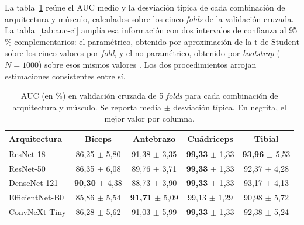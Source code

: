 \documentclass[12pt]{extarticle}
\numberwithin{equation}{section}
\begin{document}
\begin{refsection}
La tabla~\ref{tab:auc-arq-mus} reúne el AUC medio y la desviación típica de cada combinación de arquitectura y músculo, calculados sobre los cinco \textit{folds} de la validación cruzada. La tabla~\ref{tab:auc-ci} amplía esa información con dos intervalos de confianza al 95\,\% complementarios: el paramétrico, obtenido por aproximación de la t de Student sobre los cinco valores por \textit{fold}, y el no paramétrico, obtenido por \textit{bootstrap} ($N=1000$) sobre esos mismos valores \cite{efron1979bootstrap}. Los dos procedimientos arrojan estimaciones consistentes entre sí.

\begin{table}[h!]
\centering
\caption{AUC (en \%) en validación cruzada de 5 \textit{folds} para cada combinación de arquitectura y músculo. Se reporta media $\pm$ desviación típica. En negrita, el mejor valor por columna.}
\label{tab:auc-arq-mus}
\begin{tabular}{lcccc}
\toprule
\textbf{Arquitectura} & \textbf{Bíceps} & \textbf{Antebrazo} & \textbf{Cuádriceps} & \textbf{Tibial} \\
\midrule
ResNet-18       & 86{,}25 $\pm$ 5{,}80 & 91{,}38 $\pm$ 3{,}35 & \textbf{99{,}33} $\pm$ 1{,}33 & \textbf{93{,}96} $\pm$ 5{,}53 \\
ResNet-50       & 86{,}35 $\pm$ 6{,}08 & 89{,}76 $\pm$ 3{,}71 & \textbf{99{,}33} $\pm$ 1{,}33 & 92{,}37 $\pm$ 4{,}28 \\
DenseNet-121    & \textbf{90{,}30} $\pm$ 4{,}38 & 88{,}73 $\pm$ 3{,}90 & \textbf{99{,}33} $\pm$ 1{,}33 & 93{,}17 $\pm$ 4{,}13 \\
EfficientNet-B0 & 85{,}86 $\pm$ 5{,}54 & \textbf{91{,}71} $\pm$ 5{,}09 & 99{,}13 $\pm$ 1{,}29 & 90{,}98 $\pm$ 5{,}72 \\
ConvNeXt-Tiny   & 86{,}28 $\pm$ 5{,}62 & 91{,}03 $\pm$ 5{,}99 & \textbf{99{,}33} $\pm$ 1{,}33 & 92{,}38 $\pm$ 5{,}24 \\
\bottomrule
\end{tabular}
\end{table}


\end{refsection}
\end{document}
